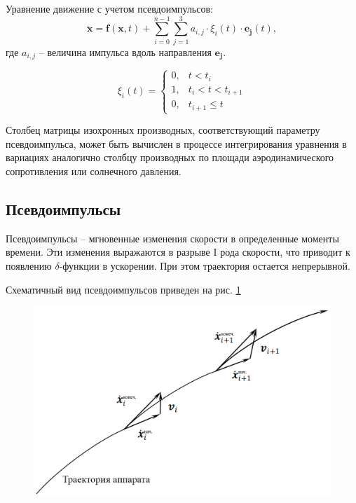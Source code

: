 Уравнение движение с учетом псевдоимпульсов:
\begin{equation*}
    \ddot{\mathbf{x}} = \mathbf{f}(\mathbf{x}, t) +
        \sum_{i=0}^{n-1} \sum_{j=1}^{3} a_{i,j} \cdot \xi_{i}(t) \cdot \mathbf{e_j} (t),
\end{equation*}
где $a_{i,j}$ -- величина импульса вдоль направления $\mathbf{e_j}$.

\begin{equation*}
    \xi_{i}(t) = 
            \begin{cases}
                0, & t < t_i \\
                1, & t_i < t < t_{i+1} \\
                0, & t_{i+1} \le t
            \end{cases}
\end{equation*}

Столбец матрицы изохронных производных, соответствующий параметру псевдоимпульса,
может быть вычислен в процессе интегрирования уравнения в вариациях аналогично
столбцу производных по площади аэродинамического сопротивления или солнечного давления.

\subsection{Псевдоимпульсы}

Псевдоимпульсы -- мгновенные изменения скорости в определенные моменты времени.
Эти изменения выражаются в разрыве I рода скорости, что приводит к появлению
$\delta$-функции в ускорении. При этом траектория остается непрерывной.

Схематичный вид псевдоимпульсов приведен на рис. \ref{fig:pseudoimp}

\begin{figure}[h!]
    \centering
    \includegraphics[width=0.8\linewidth]{../images/solution/lageos/pseudoimp.png}
    \label{fig:pseudoimp}
 \end{figure}

